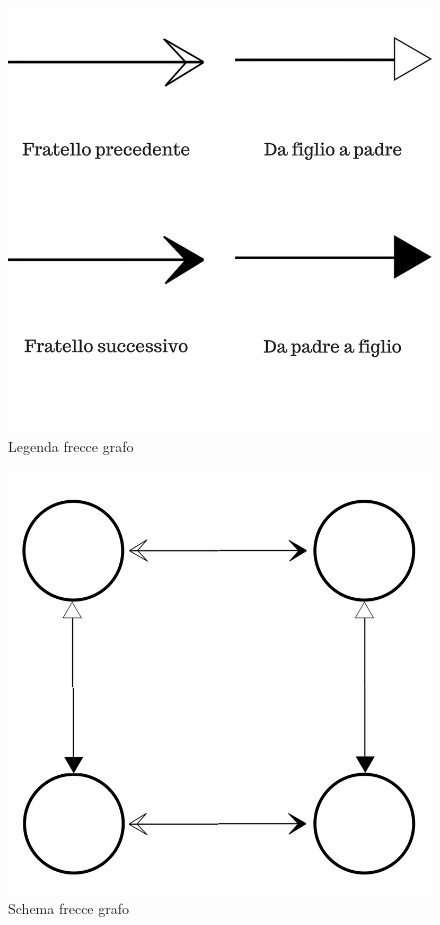\documentclass[openany,12pt,a4paper]{report}
\begin{document}
 	\begin{figure}[H]
 		
 		\centering
 		
 		\includegraphics[scale=0.4]{img/arrows/arrows-legend.png}
 		
 		\caption{Legenda frecce grafo}
 		
 	\end{figure}
 	
 	
 	\begin{figure}[H]
 		
 		\centering
 		
 		\includegraphics[scale=0.4]{img/arrows/arrows-scheme.png}
 		
 		\caption{Schema frecce grafo}
 		
 	\end{figure}
 	
\end{document}
